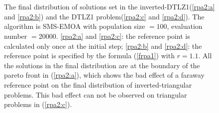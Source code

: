\documentclass[conference]{IEEEtran}
\begin{document}
\begin{figure}[!t]
  \centering
  \quad
  \\
  \quad
  \\
  \caption{The final distribution of solutions set in the inverted-DTLZ1(\ref{rpa2:a} and \ref{rpa2:b}) 
  and the DTLZ1 problem(\ref{rpa2:c} and \ref{rpa2:d}).
  The algorithm is SMS-EMOA with population size $= 100$, evaluation number $= 20000$. 
  \ref{rpa2:a} and \ref{rpa2:c}: the reference point is calculated only once at the initial step;
  \ref{rpa2:b} and \ref{rpa2:d}: the reference point is specified by the formula (\ref{frpa1}) with $r=1.1$.
  All the solutions in the final distribution are at the boundary of the pareto front in (\ref{rpa2:a}),
  which shows the bad effect of a faraway reference point
  on the final distribution of inverted-triangular problems.
  This bad effect can not be observed on triangular problems in (\ref{rpa2:c}).
  }
  \label{rpa2}
\end{figure}
\end{document}

